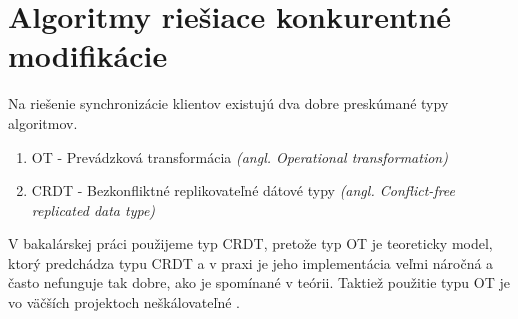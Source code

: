 \section{Algoritmy riešiace konkurentné modifikácie}
Na riešenie synchronizácie klientov existujú dva dobre preskúmané typy algoritmov.
\begin{enumerate}
  \item OT - Prevádzková transformácia \textit{(angl. Operational transformation)}
  \item CRDT - Bezkonfliktné replikovateľné dátové typy 
  \textit{(angl. Conflict-free replicated data type)}
\end{enumerate}

V bakalárskej práci použijeme typ CRDT, pretože typ OT je teoreticky model, ktorý predchádza typu CRDT a v praxi
je jeho implementácia veľmi náročná a často nefunguje tak dobre, ako je spomínané v teórii.
Taktiež použitie typu OT je vo väčších projektoch neškálovateľné \cite{ot_nonscalable}. 
